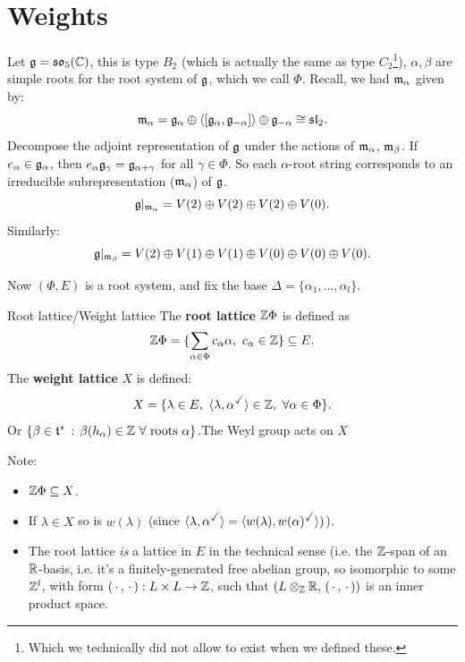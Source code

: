 \documentclass{article}
\begin{document}
\section{Weights}
\begin{ex*}
    Let $\mathfrak{g} = \mathfrak{so}_{5}(\mathbb{C})$, this is type $B_{2}$ (which is actually the same as type $C_{2}$\footnote{Which we technically did not allow to exist when we defined these.}), $\alpha,\beta$ are simple roots for the root system of $\mathfrak{g}$, which we call $\Phi$. 
    Recall, we had $\mathfrak{m}_{\alpha}$ given by: \[\mathfrak{m}_{\alpha} = \mathfrak{g}_{\alpha} \oplus \langle [\mathfrak{g}_{\alpha},\mathfrak{g}_{-\alpha}] \rangle \oplus \mathfrak{g}_{-\alpha} \cong \mathfrak{sl}_{2}.\] 
    Decompose the adjoint representation of $\mathfrak{g}$ under the actions of $\mathfrak{m}_{\alpha}$, $\mathfrak{m}_{\beta}$. \gap If $e_{\alpha} \in \mathfrak{g}_{\alpha}$, then $e_{\alpha} \mathfrak{g}_{\gamma} = \mathfrak{g}_{\alpha + \gamma}$ for all $\gamma \in \Phi$. So each $\alpha$-root string corresponds to an irreducible subrepresentation ($\mathfrak{m}_{\alpha}$) of $\mathfrak{g}$.
     \[ \mathfrak{g}|_{\mathfrak{m}_{\alpha}} = V(2) \oplus V(2) \oplus V(2) \oplus V(0).\]
    Similarly: \[ \mathfrak{g}|_{\mathfrak{m}_{\beta}} = V(2) \oplus V(1) \oplus V(1) \oplus V(0) \oplus V(0) \oplus V(0).\]
\end{ex*}
Now $(\Phi, E)$ is a root system, and fix the base $\Delta = \{\alpha_{1}, \dots, \alpha_{l}\}$.
\begin{fancydefine}{Root lattice/Weight lattice}
    The \textbf{root lattice} $\mathbb{Z}\Phi$ is defined as \[ \mathbb{Z}\Phi = \{ \sum_{\alpha \in \Phi}c_{\alpha}\alpha, \, \, c_{\alpha} \in \mathbb{Z}\} \subseteq E.\]
    The \textbf{weight lattice} $X$ is defined: \[ X = \{ \lambda \in E, \, \, \langle \lambda, \alpha^{\checked} \rangle \in \bbZ,\,\, \forall \alpha \in \Phi\}.\] Or $\{ \beta \in \mathfrak{t}^{*} \, : \, \beta(h_{\alpha}) \in \mathbb{Z} \,\, \forall \text{ roots $\alpha$}\}$.\gap The Weyl group acts on $X$
\end{fancydefine}
Note: \begin{itemize}
    \item $\mathbb{Z}\Phi \subseteq X$.
    \item If $\lambda \in X$ so is $w(\lambda)$ (since $\langle \lambda, \alpha^{\checked} \rangle = \langle w(\lambda), w(\alpha)^{\checked} \rangle)$).
    \item The root lattice \textit{is} a lattice in $E$ in the technical sense (i.e. the $\mathbb{Z}$-span of an $\mathbb{R}$-basis, i.e. it's a finitely-generated free abelian group, so isomorphic to some $\mathbb{Z}^{l}$, with form $(\, \cdot \,, \, \cdot \,) : L \times L \to \mathbb{Z}$, such that $(L \otimes_{\mathbb{Z}} \mathbb{R}, \, (\, \cdot \,, \, \cdot \,))$ is an inner product space.
\end{itemize}
\end{document}
